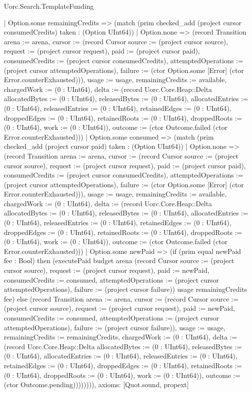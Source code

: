 \begin{lexlean}{Uorc.Search.TemplateFunding}
\begin{semanticmodule}
{      | Option.some remainingCredits => (match (prim checked_add (project cursor consumedCredits) taken : (Option UInt64))
        | Option.none => (record Transition {arena := arena, cursor := (record Cursor {source := (project cursor source), request := (project cursor request), paid := (project cursor paid), consumedCredits := (project cursor consumedCredits), attemptedOperations := (project cursor attemptedOperations), failure := (ctor Option.some [Error] (ctor Error.counterExhausted))}), usage := usage, remainingCredits := available, chargedWork := (0 : UInt64), delta := (record Uorc.Core.Heap::Delta {allocatedBytes := (0 : UInt64), releasedBytes := (0 : UInt64), allocatedEntries := (0 : UInt64), releasedEntries := (0 : UInt64), retainedEdges := (0 : UInt64), droppedEdges := (0 : UInt64), retainedRoots := (0 : UInt64), droppedRoots := (0 : UInt64), work := (0 : UInt64)}), outcome := (ctor Outcome.failed (ctor Error.counterExhausted))})
        | Option.some consumed => (match (prim checked_add (project cursor paid) taken : (Option UInt64))
          | Option.none => (record Transition {arena := arena, cursor := (record Cursor {source := (project cursor source), request := (project cursor request), paid := (project cursor paid), consumedCredits := (project cursor consumedCredits), attemptedOperations := (project cursor attemptedOperations), failure := (ctor Option.some [Error] (ctor Error.counterExhausted))}), usage := usage, remainingCredits := available, chargedWork := (0 : UInt64), delta := (record Uorc.Core.Heap::Delta {allocatedBytes := (0 : UInt64), releasedBytes := (0 : UInt64), allocatedEntries := (0 : UInt64), releasedEntries := (0 : UInt64), retainedEdges := (0 : UInt64), droppedEdges := (0 : UInt64), retainedRoots := (0 : UInt64), droppedRoots := (0 : UInt64), work := (0 : UInt64)}), outcome := (ctor Outcome.failed (ctor Error.counterExhausted))})
          | Option.some newPaid => (if (prim equal newPaid fee : Bool) then (executePaid budget arena (record Cursor {source := (project cursor source), request := (project cursor request), paid := newPaid, consumedCredits := consumed, attemptedOperations := (project cursor attemptedOperations), failure := (project cursor failure)}) usage remainingCredits fee) else (record Transition {arena := arena, cursor := (record Cursor {source := (project cursor source), request := (project cursor request), paid := newPaid, consumedCredits := consumed, attemptedOperations := (project cursor attemptedOperations), failure := (project cursor failure)}), usage := usage, remainingCredits := remainingCredits, chargedWork := (0 : UInt64), delta := (record Uorc.Core.Heap::Delta {allocatedBytes := (0 : UInt64), releasedBytes := (0 : UInt64), allocatedEntries := (0 : UInt64), releasedEntries := (0 : UInt64), retainedEdges := (0 : UInt64), droppedEdges := (0 : UInt64), retainedRoots := (0 : UInt64), droppedRoots := (0 : UInt64), work := (0 : UInt64)}), outcome := (ctor Outcome.pending)}))))))),
  axioms: [Quot.sound, propext]
}


\end{semanticmodule}
\end{lexlean}

